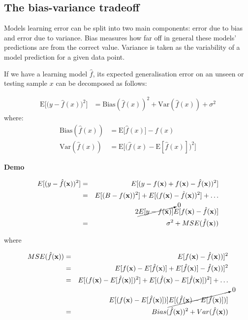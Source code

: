 \subsection{The bias-variance tradeoff} \label{sec:biasvar}

Models learning error can be split into two main components: error due to bias and error due to variance. Bias measures how far off in general these models' predictions are from the correct value. Variance is taken as the variability of a model prediction for a given data point.

If we have a learning model $\hat{f}$, its expected generalisation error on an unseen or testing sample $x$ can be decomposed as follows:

\begin{align}
\label{eq:bvtrade}
\mathrm{E}\Big[\big(y - \hat{f}(x)\big)^2\Big]
 & = \mathrm{Bias}(\hat{f}(x))^2 + \mathrm{Var}(\hat{f}(x)) + \sigma^2
\end{align}
\noindent where:
\begin{align*}
 \mathrm{Bias}(\hat{f}(x)) &= \mathrm{E}\big[\hat{f}(x)\big] - f(x) \\
 \mathrm{Var}(\hat{f}(x)) &= \mathrm{E}\Big[ \big( \hat{f}(x) - \mathrm{E}[\hat{f}(x)] \big)^2 \Big] 
\end{align*}


\textbf{Demo}\quad

\begin{eqnarray*}
E[(y-\hat{f}(\mathbf{x}))^2] & =&
E[(y-f(\mathbf{x})+f(\mathbf{x})-\hat{f}(\mathbf{x}))^2] \\
&=& E[(B-f(\mathbf{x}))^2] +
E[(f(\mathbf{x})-\hat{f}(\mathbf{x}))^2] + \dots \\
& &
2\cancelto{0}{E[y-f(\mathbf{x})]}E[f(\mathbf{x})-\hat{f}(\mathbf{x})] \\
&=& \sigma^2 + MSE(\hat{f}(\mathbf{x}))
\end{eqnarray*}

\noindent where 

\begin{eqnarray*}
    MSE(\hat{f}(\mathbf{x})) &=&
    E[f(\mathbf{x})-\hat{f}(\mathbf{x}))]^2 \\
    &=& E[f(\mathbf{x})-E[\hat{f}(\mathbf{x})] +
    E[\hat{f}(\mathbf{x})]-\hat{f}(\mathbf{x}))]^2 \\
    &=&  E[(f(\mathbf{x})-E[\hat{f}(\mathbf{x})])^2] +
      E[(\hat{f}(\mathbf{x})-E[\hat{f}(\mathbf{x})])^2] + \dots\\
    & & E[(f(\mathbf{x})-E[\hat{f}(\mathbf{x})])] 
    \cancelto{0}{E[(\hat{f}(\mathbf{x})-E[\hat{f}(\mathbf{x})])]} \\
    &=& Bias(\hat{f}(\mathbf{x}))^2 + Var(\hat{f}(\mathbf{x}))
\end{eqnarray*}

